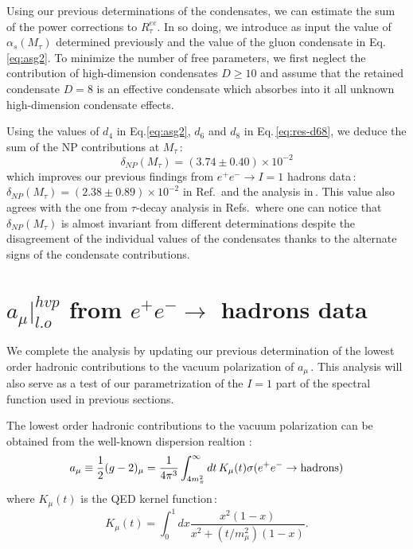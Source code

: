 \documentclass[review]{elsarticle}
\def\beq{\begin{equation}}
\def\eeq{\end{equation}}
\begin{document}
  Using our previous determinations of the condensates, we can estimate the sum of the power corrections to $R^{ee}_{\tau}$.
   In so doing, we introduce as input the value of $\alpha_s(M_\tau)$ determined previously and the value of the gluon condensate in Eq.\,\ref{eq:asg2}. To minimize the number of free parameters, we first neglect the contribution of high-dimension condensates $D\geq 10$ and assume that the retained condensate $D=8$ is an effective condensate which absorbes into it all unknown high-dimension condensate effects. 
   
 
 Using the values of $d_4$ in Eq.\ref{eq:asg2}, $d_6$ and $d_8$ in Eq.\,\ref{eq:res-d68}, we deduce the sum of the NP contributions at  $M_\tau$\,:
\beq
\delta_{NP}(M_\tau)= (3.74\pm 0.40)\times 10^{-2}
\eeq
which improves our previous findings from $e^+e^-\to I=1$ hadrons data\,: $\delta_{NP}(M_\tau)= (2.38\pm 0.89)\times 10^{-2}$ in Ref.\,\cite{SN95} and the analysis in\,\cite{SNTAU}.  This value also agrees with the one from $\tau$-decay analysis in Refs.\,\cite{ALEPH,OPAL,PICH1,PICH2,DAVIER} where one can notice that $\delta_{NP}(M_\tau)$ is almost invariant from different determinations despite the disagreement of the individual values of the condensates thanks to the alternate signs of the condensate contributions.

\section{$a_\mu\vert^{hvp}_{l.o}$ from   $e^+e^-\to$ hadrons data}
We complete the analysis by updating our previous determination of the  lowest order hadronic contributions  to the vacuum polarization of $a_\mu$\,\cite{SNamu}.  This analysis will also serve as a test of our parametrization of the $I=1$ part of the spectral function used in previous sections. 

The lowest order hadronic contributions to the vacuum polarization can be obtained from the
well-known dispersion realtion\,\cite{BOUCHIAT,DURAND,KINOSHITA,BOWCOCK,GOURDIN}\,:
\beq
a_\mu\equiv \frac{1}{2}(g-2)_\mu= \frac{1}{4\pi^3}\int_{4m_\pi^2}^\infty dt\, K_\mu(t)\sigma (e^+e^-\to {\rm hadrons})
\eeq
where $K_\mu(t)$ is the QED kernel function\,\cite{LAUTRUP}:
\beq
K_\mu(t)=\int_0^1dx\frac{x^2(1-x)}{x^2+(t/m_\mu^2)(1-x)}.
\label{eq:kmu}
\eeq
\end{document}
